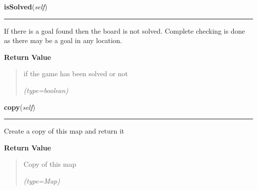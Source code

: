     \label{UnBlockMeSolver:Map:Map:Map:isSolved}

    \vspace{0.5ex}

\hspace{.8\funcindent}\begin{boxedminipage}{\funcwidth}

    \raggedright \textbf{isSolved}(\textit{self})

    \vspace{-1.5ex}

    \rule{\textwidth}{0.5\fboxrule}
\setlength{\parskip}{2ex}
    If there is a goal found then the board is not solved. Complete 
    checking is done as there may be a goal in any location.

\setlength{\parskip}{1ex}
      \textbf{Return Value}
    \vspace{-1ex}

      \begin{quote}
      if the game has been solved or not

      {\it (type=boolean)}

      \end{quote}

    \end{boxedminipage}

    \label{UnBlockMeSolver:Map:Map:Map:copy}

    \vspace{0.5ex}

\hspace{.8\funcindent}\begin{boxedminipage}{\funcwidth}

    \raggedright \textbf{copy}(\textit{self})

    \vspace{-1.5ex}

    \rule{\textwidth}{0.5\fboxrule}
\setlength{\parskip}{2ex}
    Create a copy of this map and return it

\setlength{\parskip}{1ex}
      \textbf{Return Value}
    \vspace{-1ex}

      \begin{quote}
      Copy of this map

      {\it (type=Map)}

      \end{quote}

    \end{boxedminipage}

